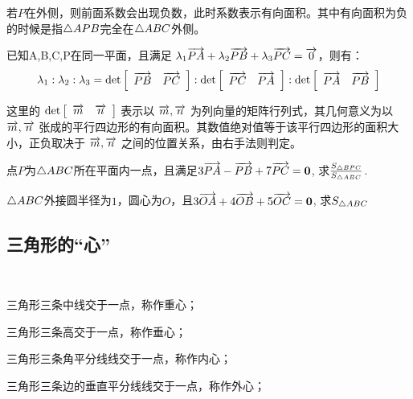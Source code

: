 若\(P\)在外侧，则前面系数会出现负数，此时系数表示有向面积。其中有向面积为负的时候是指\(\triangle APB\)完全在\(\triangle ABC\)外侧。

\begin{theorem}
    已知A,B,C,P在同一平面，且满足 \(\lambda_1 \overrightarrow{PA} + \lambda_2 \overrightarrow{PB} + \lambda_3 \overrightarrow{PC} = \overrightarrow{0}\)，则有：
\[
\lambda_1 : \lambda_2 : \lambda_3 = \mathrm{det} \left[ \begin{array}{cc} \overrightarrow{PB} & \overrightarrow{PC} \end{array} \right] : \mathrm{det} \left[ \begin{array}{cc} \overrightarrow{PC} & \overrightarrow{PA} \end{array} \right] : \mathrm{det} \left[ \begin{array}{cc} \overrightarrow{PA} & \overrightarrow{PB} \end{array} \right]
\]

这里的 \(\text{det} \left[ \begin{array}{cc} \overrightarrow{m} & \overrightarrow{n} \end{array} \right]\) 表示以 \(\overrightarrow{m}, \overrightarrow{n}\) 为列向量的矩阵行列式，其几何意义为以 \(\overrightarrow{m}, \overrightarrow{n}\) 张成的平行四边形的有向面积。其数值绝对值等于该平行四边形的面积大小，正负取决于 \(\overrightarrow{m}, \overrightarrow{n}\) 之间的位置关系，由右手法则判定。


\end{theorem}

\begin{example}
    点\(P\)为\(\triangle ABC\)所在平面内一点，且满足\(3\overrightarrow{PA}-\overrightarrow{PB}+7\overrightarrow{PC}=\boldsymbol{0}\),
    求\(\frac{S_{\triangle BPC}}{S_{\triangle ABC}}\).
\end{example}
\begin{example}
    \(\triangle ABC\)外接圆半径为\(1\)，圆心为\(O\)，且\(3\overrightarrow{OA}+4\overrightarrow{OB}+5\overrightarrow{OC}=\boldsymbol{0}\), 求\(S_{\triangle ABC}\)
\end{example}
\clearpage
\subsection{三角形的“心”}

\begin{definition}[三角形的“心”]
    \   

    三角形三条中线交于一点，称作重心；

    三角形三条高交于一点，称作垂心；

    三角形三条角平分线线交于一点，称作内心；

    三角形三条边的垂直平分线线交于一点，称作外心；
\end{definition}

